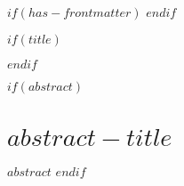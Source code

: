 $if(has-frontmatter)$
\frontmatter
$endif$

$if(title)$\maketitle$endif$

$if(abstract)$
\chapter*{$abstract-title$}
$abstract$
$endif$


